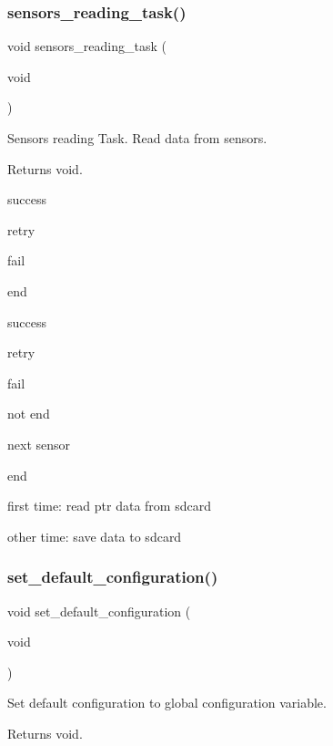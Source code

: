 \subsubsection{\texorpdfstring{sensors\+\_\+reading\+\_\+task()}{sensors\_reading\_task()}}
{\footnotesize\ttfamily void sensors\+\_\+reading\+\_\+task (\begin{DoxyParamCaption}\item[{void}]{ }\end{DoxyParamCaption})}



Sensors reading Task. Read data from sensors. 

\begin{DoxyReturn}{Returns}
void. 
\end{DoxyReturn}
success

retry

fail

end

success

retry

fail

not end

next sensor

end

first time\+: read ptr data from sdcard

other time\+: save data to sdcard \mbox{\label{rmap_8ino_a951e4934b8add405b8fe45417fc380f5}} 
\subsubsection{\texorpdfstring{set\+\_\+default\+\_\+configuration()}{set\_default\_configuration()}}
{\footnotesize\ttfamily void set\+\_\+default\+\_\+configuration (\begin{DoxyParamCaption}\item[{void}]{ }\end{DoxyParamCaption})}



Set default configuration to global configuration variable. 

\begin{DoxyReturn}{Returns}
void. 
\end{DoxyReturn}
\mbox{\label{rmap_8ino_a1686e2719fa4a37ef933458673973d28}} 
